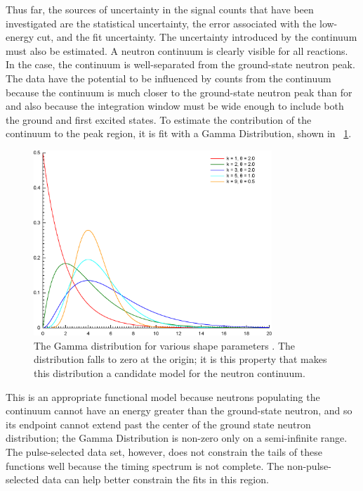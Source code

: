 Thus far, the sources of uncertainty in the signal counts that have been investigated are the statistical uncertainty, the error associated with the low-energy cut, and the fit uncertainty.  The uncertainty introduced by the continuum must also be estimated.  A neutron continuum is clearly visible for all reactions.  In the  case, the continuum is well-separated from the ground-state neutron peak.  The \reaction data have the potential to be influenced by counts from the continuum because the continuum is much closer to the ground-state neutron peak than for \MgReaction and also because the integration window must be wide enough to include both the ground and first excited states.  To estimate the contribution of the continuum to the peak region, it is fit with a Gamma Distribution, shown in {\fig}~\ref{fig:BetaGamma}.  
\begin{figure}[!htbp]
\centering
\includegraphics[width=0.8\textwidth]{figures/Gamma_distribution_pdf.eps}
\caption[The Gamma distribution.]{The Gamma distribution for various shape parameters \citep{wiki_Gamma}.  The distribution falls to zero at the origin; it is this property that makes this distribution a candidate model for the neutron continuum.}
\label{fig:BetaGamma}
\end{figure}
This is an appropriate functional model because neutrons populating the continuum cannot have an energy greater than the ground-state neutron, and so its endpoint cannot extend past the center of the ground state neutron distribution; the Gamma Distribution is non-zero only on a semi-infinite range.  The pulse-selected data set, however, does not constrain the tails of these functions well because the timing spectrum is not complete.  The non-pulse-selected data can help better constrain the fits in this region.

